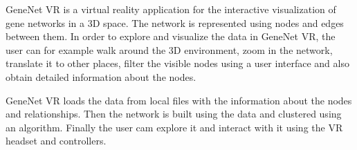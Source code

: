 %
%



GeneNet VR is a virtual reality application for the interactive visualization of gene networks in a 3D space. The network is represented using nodes and edges between them. In order to explore and visualize the data in GeneNet VR, the user can for example walk around the 3D environment, zoom in the network, translate it to other places, filter the visible nodes using a user interface and also obtain detailed information about the nodes.

GeneNet VR loads the data from local files with the information about the nodes and relationships. Then the network is built using the data and clustered using an algorithm. Finally the user cam explore it and interact with it using the VR headset and controllers.

